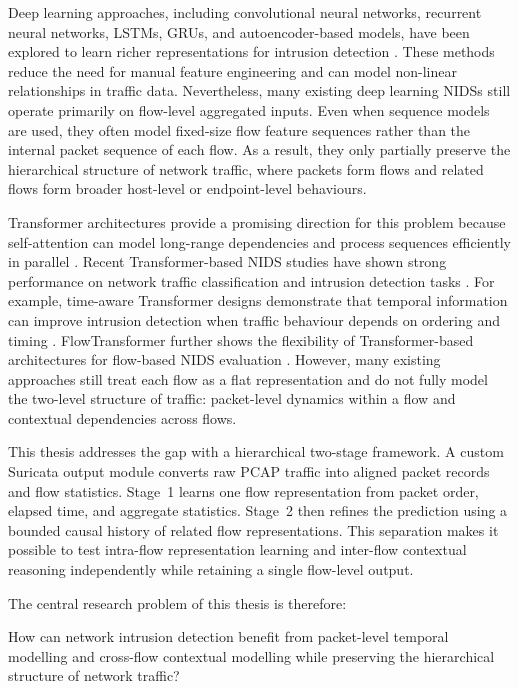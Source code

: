 \documentclass[11pt,fleqn]{report}
\begin{document}
Deep learning approaches, including convolutional neural networks, recurrent neural networks, LSTMs, GRUs, and autoencoder-based models, have been explored to learn richer representations for intrusion detection \cite{Yin2017RNNIDS,Shone2018NNAE,Mirsky2018Kitsune}. These methods reduce the need for manual feature engineering and can model non-linear relationships in traffic data. Nevertheless, many existing deep learning NIDSs still operate primarily on flow-level aggregated inputs. Even when sequence models are used, they often model fixed-size flow feature sequences rather than the internal packet sequence of each flow. As a result, they only partially preserve the hierarchical structure of network traffic, where packets form flows and related flows form broader host-level or endpoint-level behaviours.

Transformer architectures provide a promising direction for this problem because self-attention can model long-range dependencies and process sequences efficiently in parallel \cite{Vaswani2017}. Recent Transformer-based NIDS studies have shown strong performance on network traffic classification and intrusion detection tasks \cite{Wu2022RTIDS,Han2023GTID,Manocchio2024FlowTransformer}. For example, time-aware Transformer designs demonstrate that temporal information can improve intrusion detection when traffic behaviour depends on ordering and timing \cite{Han2023GTID}. FlowTransformer further shows the flexibility of Transformer-based architectures for flow-based NIDS evaluation \cite{Manocchio2024FlowTransformer}. However, many existing approaches still treat each flow as a flat representation and do not fully model the two-level structure of traffic: packet-level dynamics within a flow and contextual dependencies across flows.

This thesis addresses the gap with a hierarchical two-stage framework. A custom Suricata output module converts raw PCAP traffic into aligned packet records and flow statistics. Stage~1 learns one flow representation from packet order, elapsed time, and aggregate statistics. Stage~2 then refines the prediction using a bounded causal history of related flow representations. This separation makes it possible to test intra-flow representation learning and inter-flow contextual reasoning independently while retaining a single flow-level output.

The central research problem of this thesis is therefore:

\begin{displayquote}
How can network intrusion detection benefit from packet-level temporal modelling and cross-flow contextual modelling while preserving the hierarchical structure of network traffic?
\end{displayquote}
\end{document}
